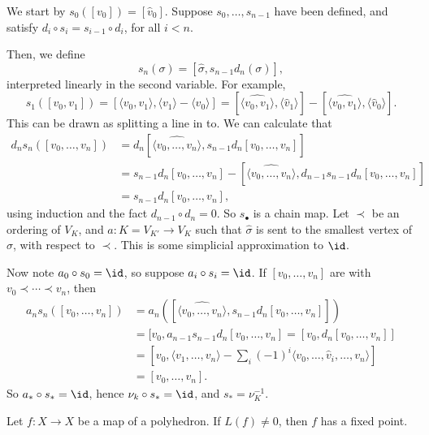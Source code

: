 \documentclass[12pt]{article}
\begin{document}
\begin{proofbox}
	We start by $s_0([v_0]) = [\hat v_0]$. Suppose $s_0, \ldots, s_{n-1}$ have been defined, and satisfy $d_i \circ s_i = s_{i-1} \circ d_i$, for all $i < n$.

	Then, we define
	\[
		s_n(\sigma) = [\hat \sigma, s_{n-1} d_n(\sigma)],
	\]
	interpreted linearly in the second variable. For example,
	\[
		s_1([v_0, v_1]) = [\langle v_0, v_1\rangle, \langle v_1 \rangle - \langle v_0 \rangle] = [\hat{\langle v_0, v_1 \rangle}, \langle \hat v_1 \rangle] - [\hat{\langle v_0, v_1 \rangle}, \langle \hat v_0 \rangle].
	\]
	This can be drawn as splitting a line in to. We can calculate that
	\begin{align*}
		d_n s_n([v_0, \ldots, v_n]) &= d_n[ \hat{\langle v_0, \ldots, v_n \rangle}, s_{n-1} d_n [v_0, \ldots, v_n] ] \\
					    &= s_{n-1} d_n [v_0, \ldots, v_n] - [ \hat{\langle v_0, \ldots, v_n \rangle}, d_{n-1} s_{n-1} d_n [v_0, \ldots, v_n] ] \\
					    &= s_{n-1} d_n [v_0, \ldots, v_n],
	\end{align*}
	using induction and the fact $d_{n-1} \circ d_n = 0$. So $s_\bullet$ is a chain map. Let $\prec$ be an ordering of $V_K$, and $a : K = V_{K'} \to V_K$ such that $\hat \sigma$ is sent to the smallest vertex of $\sigma$, with respect to $\prec$. This is some simplicial approximation to $\id$.

	Now note $a_0 \circ s_0 = \id$, so suppose $a_i \circ s_i = \id$. If $[v_0, \ldots, v_n]$ are with $v_0 \prec \cdots \prec v_n$, then
	\begin{align*}
		a_n s_n ( [v_0, \ldots, v_n]) &= a_n ( [ \hat{\langle v_0, \ldots, v_n \rangle}, s_{n-1} d_n [v_0, \ldots, v_n]]) \\
					      &= [v_0, a_{n-1} s_{n-1} d_n [v_0, \ldots, v_n] = [v_{0}, d_n [v_0, \ldots, v_n]] \\
					      &= [v_0, \langle v_1, \ldots, v_n \rangle - \sum_i (-1)^i \langle v_0, \ldots, \hat v_i, \ldots, v_n \rangle ] \\
					      &= [v_0, \ldots, v_n].
	\end{align*}
	So $a_\ast \circ s_\ast = \id$, hence $\nu_k \circ s_\ast = \id$, and $s_\ast = \nu_K^{-1}$.
\end{proofbox}

\begin{theorem}
	Let $f : X \to X$ be a map of a polyhedron. If $L(f) \neq 0$, then $f$ has a fixed point.
\end{theorem}
\end{document}
